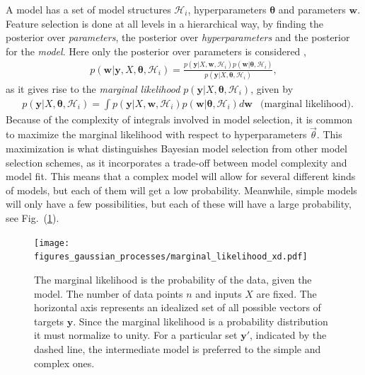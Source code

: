 \documentclass[twoside,english]{uiofysmaster}
\begin{document}
A model has a set of model structures $\mathcal{H}_i$, hyperparameters $\boldsymbol{\theta}$ and parameters $\textbf{w}$. Feature selection is done at all levels in a hierarchical way, by finding the  posterior over \textit{parameters}, the posterior over \textit{hyperparameters} and the posterior for the \textit{model}. Here only the posterior over parameters is considered \cite{rasmussen2006gaussian},
\begin{align}
p(\textbf{w}| \textbf{y}, X, \boldsymbol{\theta}, \mathcal{H}_i) = \frac{p(\textbf{y} | X, \textbf{w}, \mathcal{H}_i) p(\textbf{w}|\boldsymbol{\theta}, \mathcal{H}_i)}{p(\textbf{y}|X, \boldsymbol{\theta}, \mathcal{H}_i)},
\end{align}
as it gives rise to the \textit{marginal likelihood} $p(\textbf{y}|X, \boldsymbol{\theta}, \mathcal{H}_i)$, given by 
\begin{align}
&p(\textbf{y}|X, \boldsymbol{\theta}, \mathcal{H}_i) = \int p(\textbf{y} | X, \textbf{w}, \mathcal{H}_i)p(\textbf{w}| \boldsymbol{\theta}, \mathcal{H}_i) d \textbf{w} & \text{(marginal likelihood)}.
\end{align}
Because of the complexity of integrals involved in model selection, it is common to maximize the marginal likelihood with respect to hyperparameters $\vec{\theta}$. This maximization is what distinguishes Bayesian model selection from other model selection schemes, as it incorporates a trade-off between model complexity and model fit. This means that a complex model will allow for several different kinds of models, but each of them will get a low probability. Meanwhile, simple models will only have a few possibilities, but each of these will have a large probability, see Fig.\ (\ref{Fig:: gaussian process : Marginal likelihood Rasmussen}).

\begin{figure}
\centering
\texttt{[image: figures\_gaussian\_processes/marginal\_likelihood\_xd.pdf]}
\caption{The marginal likelihood is the probability of the data, given the model. The number of data points $n$ and inputs $X$ are fixed. The horizontal axis represents an idealized set of all possible vectors of targets $\textbf{y}$. Since the marginal likelihood is a probability distribution it must normalize to unity. For a particular set $\textbf{y}'$, indicated by the dashed line, the intermediate model is preferred to the simple and complex ones.}
\label{Fig:: gaussian process : Marginal likelihood Rasmussen}
\end{figure}
\end{document}
